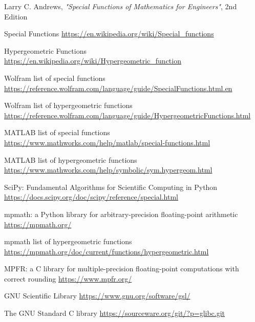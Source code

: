 \documentclass{article}
\theoremstyle{mytheoremstyle}
\theoremstyle{mytheoremstyle}
\theoremstyle{myproblemstyle}
\begin{document}
    
    \begin{thebibliography}{9}
      Larry C. Andrews, \textit{"Special Functions of Mathematics for Engineers"}, 2nd Edition

      Special Functions \url{https://en.wikipedia.org/wiki/Special_functions}  

      Hypergeometric Functions \url{https://en.wikipedia.org/wiki/Hypergeometric_function}

      Wolfram list of special functions \url{https://reference.wolfram.com/language/guide/SpecialFunctions.html.en}

      Wolfram list of hypergeometric functions \url{https://reference.wolfram.com/language/guide/HypergeometricFunctions.html}

      MATLAB list of special functions \url{https://www.mathworks.com/help/matlab/special-functions.html}

      MATLAB list of hypergeometric functions \url{https://www.mathworks.com/help/symbolic/sym.hypergeom.html}

      {{SciPy}: Fundamental Algorithms for Scientific Computing in Python} \url{https://docs.scipy.org/doc/scipy/reference/special.html}

      mpmath: a {P}ython library for arbitrary-precision floating-point arithmetic \url{https://mpmath.org/}
      
      mpmath list of hypergeometric functions \url{https://mpmath.org/doc/current/functions/hypergeometric.html}

      MPFR: a C library for multiple-precision floating-point computations with correct rounding \url{https://www.mpfr.org/}

      GNU Scientific Library \url{https://www.gnu.org/software/gsl/}

      The GNU Standard C library \url{https://sourceware.org/git/?p=glibc.git}


\end{thebibliography}
\end{document}
